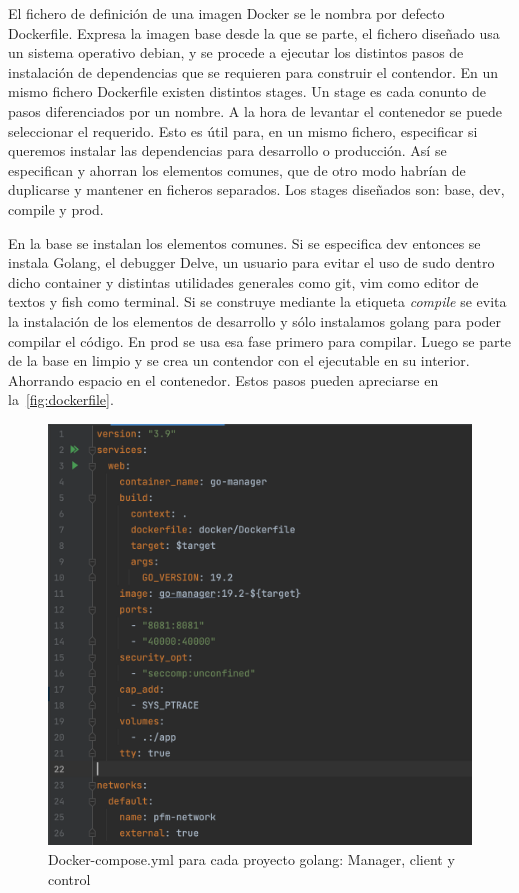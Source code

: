 
El fichero de definición de una imagen Docker se le nombra por defecto Dockerfile.
Expresa la imagen base desde la que se parte, el fichero diseñado usa un sistema operativo debian, y se procede a ejecutar los distintos pasos de instalación de dependencias que se requieren para construir el contendor.
En un mismo fichero Dockerfile existen distintos stages.
Un stage es cada conunto de pasos diferenciados por un nombre.
A la hora de levantar el contenedor se puede seleccionar el requerido.
Esto es útil para, en un mismo fichero, especificar si queremos instalar las dependencias para desarrollo o producción.
Así se especifican y ahorran los elementos comunes, que de otro modo habrían de duplicarse y mantener en ficheros separados.
Los stages diseñados son: base, dev, compile y prod.

En la base se instalan los elementos comunes.
Si se especifica dev entonces se instala Golang, el debugger Delve, un usuario para evitar el uso de sudo dentro dicho container y distintas utilidades generales como git, vim como editor de textos y fish como terminal.
Si se construye mediante la etiqueta \textit{compile} se evita la instalación de los elementos de desarrollo y sólo instalamos golang para poder compilar el código.
En prod se usa esa fase primero para compilar.
Luego se parte de la base en limpio y se crea un contendor con el ejecutable en su interior.
Ahorrando espacio en el contenedor.
Estos pasos pueden apreciarse en la~\cref{fig:dockerfile}.

\begin{figure}[H]
    \centering
    \includegraphics[scale = 0.6]{part/Proyecto_ejecutivo/memoria_constructiva/docker/docker-compose}
    \caption{Docker-compose.yml para cada proyecto golang: Manager, client y control}\label{fig:dockercompose}
\end{figure}

